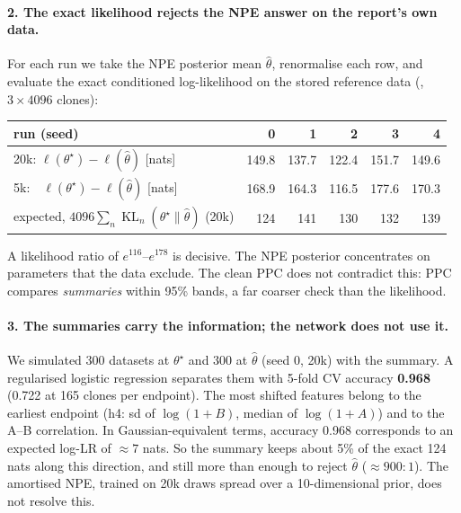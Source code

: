 \documentclass[11pt]{article}
\theoremstyle{definition}
\theoremstyle{remark}
\newcommand{\KL}{\operatorname{KL}}
\newcommand{\code}[1]{\texttt{\detokenize{#1}}}
\begin{document}
\paragraph{2. The exact likelihood rejects the NPE answer on the report's own data.} For each run we take the NPE posterior mean $\hat\theta$, renormalise each row, and evaluate the exact conditioned log-likelihood on the stored reference data (\code{reference.npz}, $3\times4096$ clones):
\begin{center}\small
\begin{tabular}{@{}lrrrrr@{}}\toprule
run (seed) & 0 & 1 & 2 & 3 & 4\\\midrule
20k: $\ell(\theta^\star)-\ell(\hat\theta)$ [nats] & 149.8 & 137.7 & 122.4 & 151.7 & 149.6\\
5k:\ \ $\ell(\theta^\star)-\ell(\hat\theta)$ [nats] & 168.9 & 164.3 & 116.5 & 177.6 & 170.3\\
expected, $4096\sum_n\KL_n(\theta^\star\|\hat\theta)$ (20k) & 124 & 141 & 130 & 132 & 139\\\bottomrule
\end{tabular}
\end{center}
A likelihood ratio of $e^{116}$--$e^{178}$ is decisive. The NPE posterior concentrates on parameters that the data exclude. The clean PPC does not contradict this: PPC compares \emph{summaries} within 95\% bands, a far coarser check than the likelihood.

\paragraph{3. The summaries carry the information; the network does not use it.} We simulated 300 datasets at $\theta^\star$ and 300 at $\hat\theta$ (seed 0, 20k) with the \code{moments} summary. A regularised logistic regression separates them with 5-fold CV accuracy \textbf{0.968} (0.722 at 165 clones per endpoint). The most shifted features belong to the earliest endpoint (h4: sd of $\log(1+B)$, median of $\log(1+A)$) and to the A--B correlation. In Gaussian-equivalent terms, accuracy 0.968 corresponds to an expected log-LR of $\approx7$ nats. So the summary keeps about 5\% of the exact 124 nats along this direction, and still more than enough to reject $\hat\theta$ ($\approx900{:}1$). The amortised NPE, trained on 20k draws spread over a 10-dimensional prior, does not resolve this.
\end{document}
